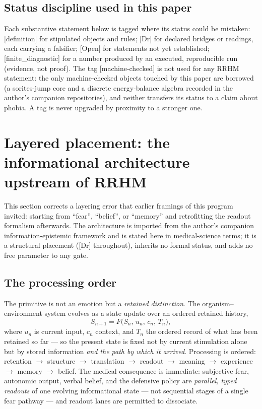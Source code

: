 \documentclass[9pt,twocolumn]{article}
\newcommand{\tier}[1]{{\sffamily\scriptsize\color{RRHMSlate}[#1]}}
\begin{document}
\subsection{Status discipline used in this paper}
Each substantive statement below is tagged where its status could be mistaken: \tier{definition} for stipulated objects and rules; \tier{Dr} for declared bridges or readings, each carrying a falsifier; \tier{Open} for statements not yet established; \tier{finite\_diagnostic} for a number produced by an executed, reproducible run (evidence, not proof). The tag \tier{machine-checked} is not used for any RRHM statement: the only machine-checked objects touched by this paper are borrowed (a sorites-jump core and a discrete energy-balance algebra recorded in the author's companion repositories), and neither transfers its status to a claim about phobia. A tag is never upgraded by proximity to a stronger one.

\section{Layered placement: the informational architecture upstream of RRHM}
\label{sec:layers}
This section corrects a layering error that earlier framings of this program invited: starting from ``fear'', ``belief'', or ``memory'' and retrofitting the readout formalism afterwards. The architecture is imported from the author's companion information-epistemic framework \cite{lahtee2026genesis} and is stated here in medical-science terms; it is a structural placement (\tier{Dr} throughout), inherits no formal status, and adds no free parameter to any gate.

\subsection{The processing order}
The primitive is not an emotion but a \emph{retained distinction}. The organism--environment system evolves as a state update over an ordered retained history,
\begin{equation}
S_{n+1}=F\big(S_n,\,u_n,\,c_n,\,T_n\big),
\label{eq:stateupdate}
\end{equation}
where $u_n$ is current input, $c_n$ context, and $T_n$ the ordered record of what has been retained so far --- so the present state is fixed not by current stimulation alone but by stored information \emph{and the path by which it arrived}. Processing is ordered: retention $\to$ structure $\to$ translation $\to$ readout $\to$ meaning $\to$ experience $\to$ memory $\to$ belief. The medical consequence is immediate: subjective fear, autonomic output, verbal belief, and the defensive policy are \emph{parallel, typed readouts} of one evolving informational state --- not sequential stages of a single fear pathway --- and readout lanes are permitted to dissociate.
\end{document}
